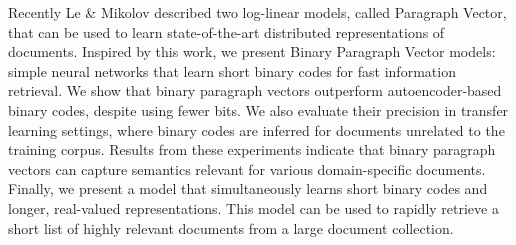 Recently Le \& Mikolov described two log-linear models, called Paragraph Vector, that can be used to learn state-of-the-art distributed representations of documents. Inspired by this work, we present Binary Paragraph Vector models: simple neural networks that learn short binary codes for fast information retrieval. We show that binary paragraph vectors outperform autoencoder-based binary codes, despite using fewer bits. We also evaluate their precision in transfer learning settings, where binary codes are inferred for documents unrelated to the training corpus. Results from these experiments indicate that binary paragraph vectors can capture semantics relevant for various domain-specific documents. Finally, we present a model that simultaneously learns short binary codes and longer, real-valued representations. This model can be used to rapidly retrieve a short list of highly relevant documents from a large document collection.
